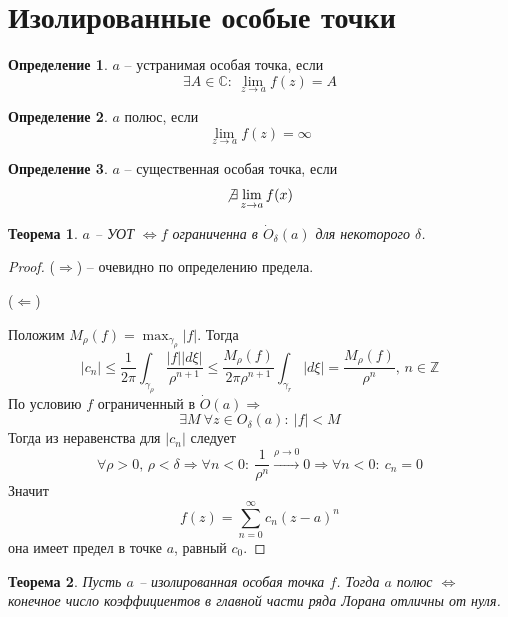 \documentclass[a4paper,12pt]{article}
\renewcommand{\leq}{\ensuremath{\leqslant}}
\theoremstyle{plain}
\newtheorem{theorem}{Теорема}[section]
\theoremstyle{definition}
\newtheorem{definition}{Определение}[section]
\theoremstyle{remark}
\begin{document}
\section{Изолированные особые точки}
\begin{definition}
	$a$ -- устранимая особая точка, если
	\[
		\exists A \in \mathbb{C} :\: \lim_{z \to a} f(z) = A
	\]
\end{definition}

\begin{definition}
	$a$ полюс, если
	\[
		\lim_{z \to a} f(z) = \infty
	\]
\end{definition}

\begin{definition}
	$a$ -- существенная особая точка, если
	\[
		\not\exists \lim_{z \to a}f(x)
	\]
\end{definition}

\begin{theorem}
	$a$ -- УОТ $\Leftrightarrow f$ ограниченна в $\dot{O}_\delta(a)$ для некоторого $\delta$.
\end{theorem}

\begin{proof}
	($\Rightarrow$) -- очевидно по определению предела.

	($\Leftarrow$)

	Положим $M_\rho(f) = \max_{\gamma_\rho}\vert f\vert$. Тогда
	\[
		\vert c_n\vert \leq \frac{1}{2\pi}\int_{\gamma_\rho} \frac{\vert f\vert\vert d\xi\vert}{\rho^{n + 1}} \leq \frac{M_\rho(f)}{2\pi\rho^{n + 1}}\int_{\gamma_r}\vert d\xi\vert = \frac{M_\rho(f)}{\rho^n},\, n \in \mathbb{Z}
	\]
	По условию $f$ ограниченный в $\dot{O}(a) \Rightarrow$
	\[
		\exists M \: \forall z \in O_\delta(a) :\: \vert f\vert < M
	\]
	Тогда из неравенства для $\vert c_n\vert$ следует
	\[
		\forall \rho > 0,\, \rho < \delta \Rightarrow \forall n < 0 :\: \frac{1}{\rho^n} \overset{\rho \to 0}{\to} 0 \Rightarrow \forall n < 0 :\: c_n = 0
	\]
	Значит
	\[
		f(z) = \sum_{n = 0}^\infty c_n(z - a)^n
	\]
	она имеет предел в точке $a$, равный $c_0$.
\end{proof}

\begin{theorem}
	Пусть $a$ -- изолированная особая точка $f$. Тогда $a$ полюс $\Leftrightarrow$ конечное число коэффициентов в главной части ряда Лорана отличны от нуля.
\end{theorem}
\end{document}
